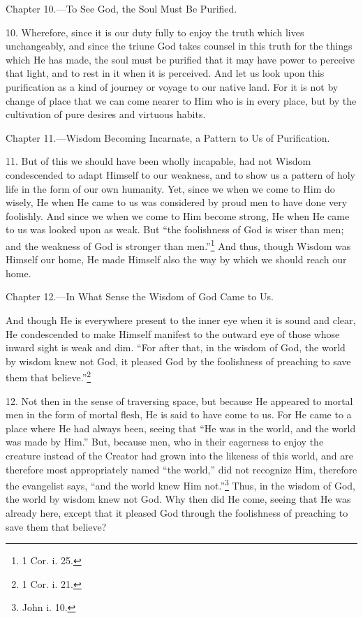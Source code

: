 
Chapter 10.—To See God, the Soul Must Be Purified.

10. Wherefore, since it is our duty fully to enjoy the truth which lives unchangeably, and since the triune God takes counsel in this truth for the things which He has made, the soul must be purified that it may have power to perceive that light, and to rest in it when it is perceived. And let us look upon this purification as a kind of journey or voyage to our native land. For it is not by change of place that we can come nearer to Him who is in every place, but by the cultivation of pure desires and virtuous habits.


Chapter 11.—Wisdom Becoming Incarnate, a Pattern to Us of Purification.

11. But of this we should have been wholly incapable, had not Wisdom condescended to adapt Himself to our weakness, and to show us a pattern of holy life in the form of our own humanity. Yet, since we when we come to Him do wisely, He when He came to us was considered by proud men to have done very foolishly. And since we when we come to Him become strong, He when He came to us was looked upon as weak. But “the foolishness of God is wiser than men; and the weakness of God is stronger than men.”\footnote{1 Cor. i. 25.} And thus, though Wisdom was Himself our home, He made Himself also the way by which we should reach our home.


Chapter 12.—In What Sense the Wisdom of God Came to Us.

And though He is everywhere present to the inner eye when it is sound and clear, He condescended to make Himself manifest to the outward eye of those whose inward sight is weak and dim. “For after that, in the wisdom of God, the world by wisdom knew not God, it pleased God by the foolishness of preaching to save them that believe.”\footnote{1 Cor. i. 21.}

12. Not then in the sense of traversing space, but because He appeared to mortal men in the form of mortal flesh, He is said to have come to us. For He came to a place where He had always been, seeing that “He was in the world, and the world was made by Him.” But, because men, who in their eagerness to enjoy the creature instead of the Creator had grown into the likeness of this world, and are therefore most appropriately named “the world,” did not recognize Him, therefore the evangelist says, “and the world knew Him not.”\footnote{John i. 10.} Thus, in the wisdom of God, the world by wisdom knew not God. Why then did He come, seeing that He was already here, except that it pleased God through the foolishness of preaching to save them that believe?

